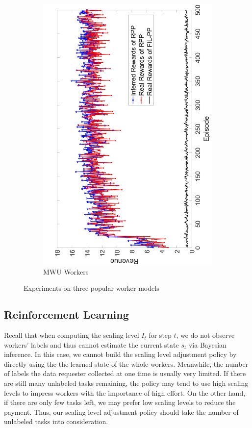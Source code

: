 \documentclass[letterpaper]{article} %
\begin{document}
\begin{figure}[htb]
\begin{subfigure}[t]{0.35\textwidth}
        \includegraphics[width=\textwidth]{image/3}
        \caption{\label{E3}  MWU Workers}
    \end{subfigure}
    \caption{\label{ED}Experiments on three popular worker models}
\end{figure}
\subsection{Reinforcement Learning} 
Recall that when computing the scaling level $I_{t}$ for step $t$, we do not observe workers' labels and thus cannot estimate the current state $s_{t}$ via Bayesian inference.
In this case, we cannot build the scaling level adjustment policy by directly using the the learned state of the whole workers.
Meanwhile, the number of labels the data requester collected at one time is usually very limited.
If there are still many unlabeled tasks remaining, the policy may tend to use high scaling levels to impress workers with the importance of high effort. On the other hand, if there are only few tasks left, we may prefer low scaling levels to reduce the payment.
Thus, our scaling level adjustment policy should take the number of unlabeled tasks into consideration.
\end{document}
